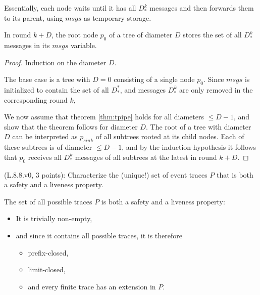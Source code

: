 Essentially, each node waits until it has all $D_*^k$ messages and
then forwards them to its parent, using $msgs$ as temporary storage.

\begin{lemma} \label{lem:tpipe}
In round $k + D$, the root node $p_0$ of a tree of diameter $D$
stores the set of all $D_*^k$ messages in its $msgs$ variable.
\end{lemma}

\begin{proof}
Induction on the diameter $D$.

The base case is a tree with $D = 0$ consisting of a single node $p_0$. Since $msgs$
is initialized to contain the set of all $D_*^*$, and messages $D_*^k$ are only removed in the
corresponding round $k$,

We now assume that theorem \ref{thm:tpipe} holds for all diameters $\leq D - 1$,
and show that the theorem follows for diameter $D$. The root of a tree with diameter $D$
can be interpreted as $p_{sink}$ of all subtrees rooted at its child nodes. Each of these subtrees
is of diameter $\leq D - 1$, and by the induction hypothesis it follows that $p_0$
receives all $D_*^k$ messages of all subtrees at the latest in round $k + D$.
\end{proof}


\begin{Exc}{(L.8.8.v0, 3 points):}
Characterize the (unique!) set of event traces $P$ that is both
a safety and a liveness property.
\end{Exc}


The set of all possible traces $P$ is both a safety and a liveness property:

\begin{itemize}
\item It is trivially non-empty,
\item and since it contains all possible traces, it is therefore
    \begin{itemize}
    \item prefix-closed,
    \item limit-closed,
    \item and every finite trace has an extension in $P$.
    \end{itemize}
\end{itemize}


